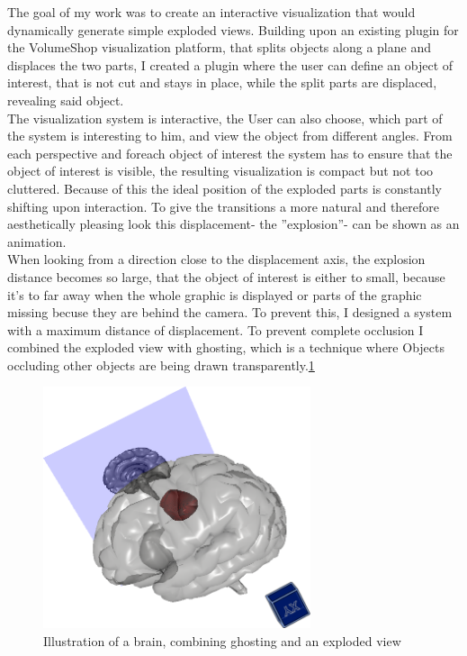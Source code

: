 The goal of my work was to create an interactive visualization that would dynamically generate simple exploded views. Building upon an existing plugin for the VolumeShop visualization platform, that splits objects along a plane and displaces the two parts,  I created a plugin where the user can define an object of interest, that is not cut and stays in place, while the split parts are displaced, revealing said object.\\
The visualization system is interactive, the User can also choose, which part of the system is interesting to him, and view the object from different angles. From each perspective and foreach object of interest the system has to ensure that the object of interest is visible, the resulting visualization is compact but not too cluttered.  Because of this the ideal position of the exploded parts is constantly shifting upon interaction. To give the transitions a more natural and therefore aesthetically pleasing look this displacement- the ''explosion''- can be shown as an animation.\\
When looking from a direction close to the displacement axis, the explosion distance becomes so large, that the object of interest is either to small, because it's to far away when the whole graphic is displayed or parts of the graphic missing becuse they are behind the camera.
To prevent this, I designed a system with a maximum distance of displacement. To prevent complete occlusion I combined the exploded view with ghosting, which is a technique where Objects occluding other objects are being drawn transparently.\ref{fig:demo} \\
\begin{figure}[tb]
	\centering
	\includegraphics[width=0.7\textwidth]{chapters/figures/demo}
	\caption{Illustration of a brain, combining ghosting and an exploded view}
	\label{fig:demo}
\end{figure}